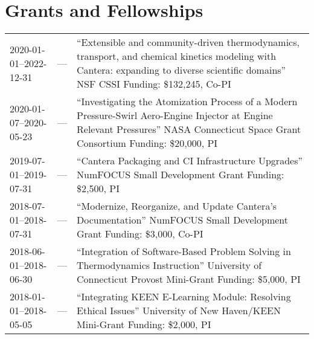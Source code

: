 \section{{\sectionfont Grants and Fellowships}}
\vspace{-0.32in}
\begin{center}
    \begin{longtable}{lcl}
        2020-01-01--2022-12-31 & --- & \makecell{``Extensible and community-driven thermodynamics,    \\transport, and chemical kinetics modeling with\\Cantera: expanding to diverse scientific domains''\\ NSF CSSI \\ Funding: \$132,245, Co-PI} \\
        2020-01-07--2020-05-23 & --- & \makecell{``Investigating the Atomization Process of a Modern  \\Pressure-Swirl Aero-Engine Injector at Engine\\Relevant Pressures''\\NASA Connecticut Space Grant Consortium \\ Funding: \$20,000, PI} \\
        2019-07-01--2019-07-31 & --- & \makecell{``Cantera Packaging and CI Infrastructure Upgrades'' \\NumFOCUS Small Development Grant\\Funding: \$2,500, PI} \\
        2018-07-01--2018-07-31 & --- & \makecell{``Modernize, Reorganize, and Update Cantera's        \\Documentation''\\ NumFOCUS Small Development Grant \\ Funding: \$3,000, Co-PI} \\
        2018-06-01--2018-06-30 & --- & \makecell{``Integration of Software-Based Problem Solving in   \\Thermodynamics Instruction''\\ University of Connecticut Provost Mini-Grant \\ Funding: \$5,000, PI} \\
        2018-01-01--2018-05-05 & --- & \makecell{``Integrating KEEN E-Learning Module: Resolving      \\Ethical Issues''\\ University of New Haven/KEEN Mini-Grant \\ Funding: \$2,000, PI} \\

\end{longtable}
\end{center}

